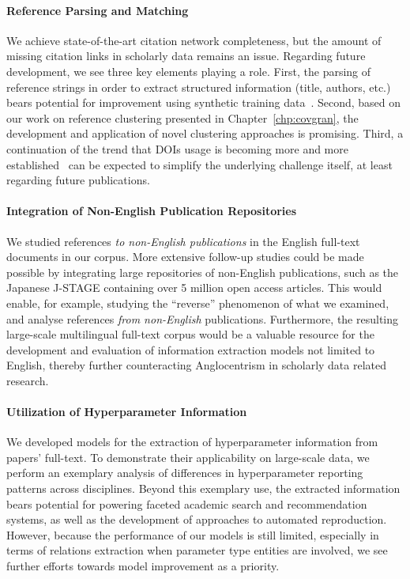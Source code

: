 \paragraph{Reference Parsing and Matching}
%
We achieve state-of-the-art citation network completeness, but the amount of missing citation links in scholarly data remains an issue. Regarding future development, we see three key elements playing a role. First, the parsing of reference strings in order to extract structured information (title, authors, etc.) bears potential for improvement using synthetic training data~\cite{Shapiro2022}. Second, based on our work on reference clustering presented in Chapter~\ref{chp:covgran}, the development and application of novel clustering approaches is promising. Third, a continuation of the trend that DOIs usage is becoming more and more established~\cite{Gorraiz2016} can be expected to simplify the underlying challenge itself, at least regarding future publications.

\paragraph{Integration of Non-English Publication Repositories}
We studied references \emph{to non-English publications} in the English full-text documents in our corpus. More extensive follow-up studies could be made possible by integrating large repositories of non-English publications, such as the Japanese J-STAGE containing over 5 million open access articles. This would enable, for example, studying the ``reverse'' phenomenon of what we examined, and analyse references \emph{from non-English} publications. Furthermore, the resulting large-scale multilingual full-text corpus would be a valuable resource for the development and evaluation of information extraction models not limited to English, thereby further counteracting Anglocentrism in scholarly data related research.

\paragraph{Utilization of Hyperparameter Information}
We developed models for the extraction of hyperparameter information from papers' full-text. To demonstrate their applicability on large-scale data, we perform an exemplary analysis of differences in hyperparameter reporting patterns across disciplines. Beyond this exemplary use, the extracted information bears potential for powering faceted academic search and recommendation systems, as well as the development of approaches to automated reproduction. However, because the performance of our models is still limited, especially in terms of relations extraction when parameter type entities are involved, we see further efforts towards model improvement as a priority.


